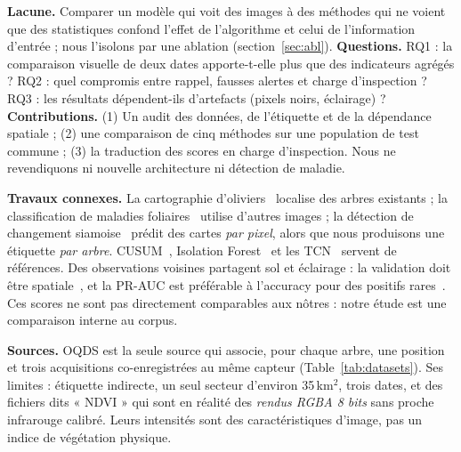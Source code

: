 \documentclass[10pt,a4paper,twocolumn]{article}
\makeatletter
\renewcommand\section{\@startsection{section}{1}{\z@}{-1.3ex plus -.3ex}{0.5ex}{\normalfont\large\bfseries\color{olive}}}
\makeatother
\begin{document}
\textbf{Lacune.} Comparer un modèle qui voit des images à des méthodes qui ne voient que des statistiques confond l'effet de
l'algorithme et celui de l'information d'entrée ; nous l'isolons par une ablation (section~\ref{sec:abl}).
\textbf{Questions.} RQ1 : la comparaison visuelle de deux dates apporte-t-elle plus que des indicateurs agrégés ? RQ2 : quel
compromis entre rappel, fausses alertes et charge d'inspection ? RQ3 : les résultats dépendent-ils d'artefacts (pixels noirs,
éclairage) ? \textbf{Contributions.} (1) Un audit des données, de l'étiquette et de la dépendance spatiale ; (2) une
comparaison de cinq méthodes sur une population de test commune ; (3) la traduction des scores en charge d'inspection. Nous
ne revendiquons ni nouvelle architecture ni détection de maladie.

\textbf{Travaux connexes.} La cartographie d'oliviers~\cite{lin} localise des arbres existants ; la classification de maladies
foliaires~\cite{raouhi} utilise d'autres images ; la détection de changement siamoise~\cite{bromley,daudt} prédit des cartes
\emph{par pixel}, alors que nous produisons une étiquette \emph{par arbre}. CUSUM~\cite{page}, Isolation Forest~\cite{iforest} et
les TCN~\cite{bai} servent de références. Des observations voisines partagent sol et éclairage : la validation doit être
spatiale~\cite{roberts,valavi}, et la PR-AUC est préférable à l'accuracy pour des positifs rares~\cite{saito}. Ces scores ne
sont pas directement comparables aux nôtres : notre étude est une comparaison interne au corpus.

\section{Données}
\textbf{Sources.} OQDS est la seule source qui associe, pour chaque arbre, une position et trois acquisitions co-enregistrées
au même capteur (Table~\ref{tab:datasets}). Ses limites : étiquette indirecte, un seul secteur d'environ 35\,km$^2$, trois
dates, et des fichiers dits « NDVI » qui sont en réalité des \emph{rendus RGBA 8 bits} sans proche infrarouge calibré. Leurs
intensités sont des caractéristiques d'image, pas un indice de végétation physique.
\end{document}
